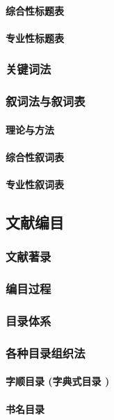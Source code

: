 \documentclass[UTF8]{../../ApplicationUniverse}
\begin{document}
            \paragraph{综合性标题表}
            \paragraph{专业性标题表}
        \subsubsection{关键词法}
        \subsubsection{叙词法与叙词表}
            \paragraph{理论与方法}
            \paragraph{综合性叙词表}
            \paragraph{专业性叙词表}
    \subsection{文献编目}
        \subsubsection{文献著录}
            \subsubsection{编目过程}
        \subsubsection{目录体系}
        \subsubsection{各种目录组织法}
            \paragraph{字顺目录 (字典式目录 )}
            \paragraph{书名目录}
\end{document}
